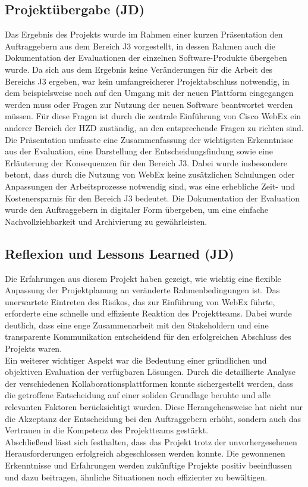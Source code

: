 \documentclass[ThesisDJ.tex]{subfiles}
\begin{document}
	\subsection{Projektübergabe (JD)}
	Das Ergebnis des Projekts wurde im Rahmen einer kurzen Präsentation den Auftraggebern aus dem Bereich J3 vorgestellt, in dessen Rahmen auch die Dokumentation der Evaluationen der einzelnen Software-Produkte übergeben wurde. Da sich aus dem Ergebnis keine Veränderungen für die Arbeit des Bereichs J3 ergeben, war kein umfangreicherer Projektabschluss notwendig, in dem beispielsweise noch auf den Umgang mit der neuen Plattform eingegangen werden muss oder Fragen zur Nutzung der neuen Software beantwortet werden müssen. Für diese Fragen ist durch die zentrale Einführung von Cisco WebEx ein anderer Bereich der HZD zuständig, an den entsprechende Fragen zu richten sind. \\
	Die Präsentation umfasste eine Zusammenfassung der wichtigsten Erkenntnisse aus der Evaluation, eine Darstellung der Entscheidungsfindung sowie eine Erläuterung der Konsequenzen für den Bereich J3. Dabei wurde insbesondere betont, dass durch die Nutzung von WebEx keine zusätzlichen Schulungen oder Anpassungen der Arbeitsprozesse notwendig sind, was eine erhebliche Zeit- und Kostenersparnis für den Bereich J3 bedeutet. Die Dokumentation der Evaluation wurde den Auftraggebern in digitaler Form übergeben, um eine einfache Nachvollziehbarkeit und Archivierung zu gewährleisten. \\
	
	\subsection{Reflexion und Lessons Learned (JD)}
	Die Erfahrungen aus diesem Projekt haben gezeigt, wie wichtig eine flexible Anpassung der Projektplanung an veränderte Rahmenbedingungen ist. Das unerwartete Eintreten des Risikos, das zur Einführung von WebEx führte, erforderte eine schnelle und effiziente Reaktion des Projektteams. Dabei wurde deutlich, dass eine enge Zusammenarbeit mit den Stakeholdern und eine transparente Kommunikation entscheidend für den erfolgreichen Abschluss des Projekts waren. \\
	Ein weiterer wichtiger Aspekt war die Bedeutung einer gründlichen und objektiven Evaluation der verfügbaren Lösungen. Durch die detaillierte Analyse der verschiedenen Kollaborationsplattformen konnte sichergestellt werden, dass die getroffene Entscheidung auf einer soliden Grundlage beruhte und alle relevanten Faktoren berücksichtigt wurden. Diese Herangehensweise hat nicht nur die Akzeptanz der Entscheidung bei den Auftraggebern erhöht, sondern auch das Vertrauen in die Kompetenz des Projektteams gestärkt. \\
	Abschließend lässt sich festhalten, dass das Projekt trotz der unvorhergesehenen Herausforderungen erfolgreich abgeschlossen werden konnte. Die gewonnenen Erkenntnisse und Erfahrungen werden zukünftige Projekte positiv beeinflussen und dazu beitragen, ähnliche Situationen noch effizienter zu bewältigen.
\end{document}
